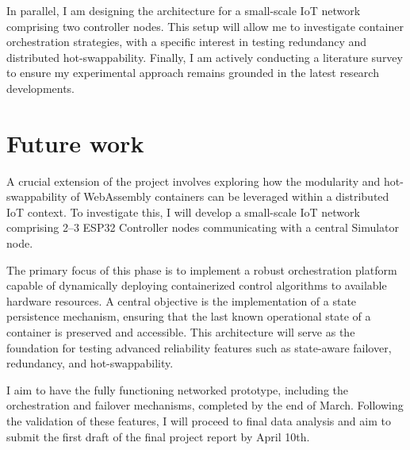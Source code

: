 \documentclass[12pt, a4paper]{report}
\begin{document}
In parallel, I am designing the architecture for a small-scale IoT network comprising two controller nodes. This setup will allow me to investigate container orchestration strategies, with a specific interest in testing redundancy and distributed hot-swappability. Finally, I am actively conducting a literature survey to ensure my experimental approach remains grounded in the latest research developments.

\section*{Future work}
A crucial extension of the project involves exploring how the modularity and hot-swappability of WebAssembly containers can be leveraged within a distributed IoT context. To investigate this, I will develop a small-scale IoT network comprising 2--3 ESP32 Controller nodes communicating with a central Simulator node.

The primary focus of this phase is to implement a robust orchestration platform capable of dynamically deploying containerized control algorithms to available hardware resources. A central objective is the implementation of a state persistence mechanism, ensuring that the last known operational state of a container is preserved and accessible. This architecture will serve as the foundation for testing advanced reliability features such as state-aware failover, redundancy, and hot-swappability.

I aim to have the fully functioning networked prototype, including the orchestration and failover mechanisms, completed by the end of March. Following the validation of these features, I will proceed to final data analysis and aim to submit the first draft of the final project report by April 10th.


\end{document}
